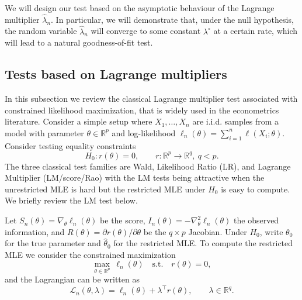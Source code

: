\documentclass[12pt]{article}
\numberwithin{equation}{section}
\begin{document}
We will design our test based on the asymptotic behaviour of the Lagrange multiplier $\hat{\lambda}_n$.
In particular, we will demonstrate that, under the null hypothesis, the random variable $\hat{\lambda}_n$ will converge to some constant $\lambda^{\circ}$ at a certain rate, which will lead to a natural goodness-of-fit test.

\subsection{Tests based on Lagrange multipliers}{\label{sec:lag_mult}}

In this subsection we review the classical Lagrange multiplier test associated with constrained likelihood maximization, that is widely used in the econometrics literature. Consider a simple setup where \(X_1,\dots,X_n\) are i.i.d. samples from a model with parameter \(\theta\in\mathbb{R}^p\) and log-likelihood \(\ell_n(\theta)=\sum_{i=1}^n \ell(X_i;\theta)\). Consider testing equality constraints
\begin{equation}\label{eq:H0}
H_0: r(\theta)=0,\qquad r: \mathbb{R}^p\to\mathbb{R}^q,\ q<p.
\end{equation}
The three classical test families are Wald, Likelihood Ratio (LR), and Lagrange Multiplier (LM/score/Rao) with the LM tests being attractive when the unrestricted MLE is hard but the restricted MLE under \(H_0\) is easy to compute. We briefly review the LM test below. 

 Let \(S_n(\theta)=\nabla_\theta \ell_n(\theta)\) be the score, \(I_n(\theta)=-\nabla_\theta^2 \ell_n(\theta)\) the observed information, and \(R(\theta)=\partial r(\theta)/\partial \theta\) be the \(q\times p\) Jacobian. Under \(H_0\), write \(\theta_0\) for the true parameter and \(\hat\theta_0\) for the restricted MLE. To compute the restricted MLE we consider the constrained maximization
\begin{equation*}
\max_{\theta\in\mathbb{R}^p} \ \ell_n(\theta)\quad\text{s.t.}\quad r(\theta)=0,
\end{equation*}
and the Lagrangian can be written as
\begin{equation*}
\mathcal{L}_n(\theta,\lambda)=\ell_n(\theta)+\lambda^\top r(\theta),\qquad \lambda\in\mathbb{R}^q.
\end{equation*}
\end{document}
